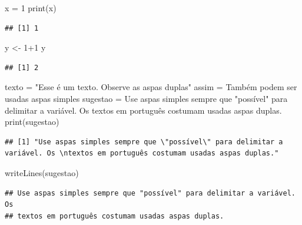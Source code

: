 \documentclass[
]{book}
\newenvironment{Shaded}{\begin{snugshade}}{\end{snugshade}}
\newcommand{\DecValTok}[1]{\textcolor[rgb]{0.00,0.00,0.81}{#1}}
\newcommand{\FunctionTok}[1]{\textcolor[rgb]{0.00,0.00,0.00}{#1}}
\newcommand{\NormalTok}[1]{#1}
\newcommand{\OtherTok}[1]{\textcolor[rgb]{0.56,0.35,0.01}{#1}}
\newcommand{\SpecialCharTok}[1]{\textcolor[rgb]{0.00,0.00,0.00}{#1}}
\newcommand{\StringTok}[1]{\textcolor[rgb]{0.31,0.60,0.02}{#1}}
\begin{document}
\begin{Shaded}
\begin{Highlighting}[]
\NormalTok{x }\OtherTok{=} \DecValTok{1}
\FunctionTok{print}\NormalTok{(x)}
\end{Highlighting}
\end{Shaded}

\begin{verbatim}
## [1] 1
\end{verbatim}

\begin{Shaded}
\begin{Highlighting}[]
\NormalTok{y }\OtherTok{\textless{}{-}} \DecValTok{1}\SpecialCharTok{+}\DecValTok{1}
\NormalTok{y}
\end{Highlighting}
\end{Shaded}

\begin{verbatim}
## [1] 2
\end{verbatim}

\begin{Shaded}
\begin{Highlighting}[]
\NormalTok{texto }\OtherTok{=} \StringTok{"Esse é um texto. Observe as aspas duplas"}
\NormalTok{assim }\OtherTok{=} \StringTok{\textquotesingle{}Também podem ser usadas aspas simples\textquotesingle{}}
\NormalTok{sugestao }\OtherTok{=} \StringTok{\textquotesingle{}Use aspas simples sempre que "possível" para delimitar a variável. Os }
\StringTok{textos em português costumam usadas aspas duplas.\textquotesingle{}}
\FunctionTok{print}\NormalTok{(sugestao)}
\end{Highlighting}
\end{Shaded}

\begin{verbatim}
## [1] "Use aspas simples sempre que \"possível\" para delimitar a variável. Os \ntextos em português costumam usadas aspas duplas."
\end{verbatim}

\begin{Shaded}
\begin{Highlighting}[]
\FunctionTok{writeLines}\NormalTok{(sugestao)}
\end{Highlighting}
\end{Shaded}

\begin{verbatim}
## Use aspas simples sempre que "possível" para delimitar a variável. Os 
## textos em português costumam usadas aspas duplas.
\end{verbatim}
\end{document}
